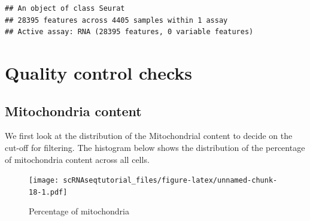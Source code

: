 \documentclass[
  openany]{book}
\newenvironment{Shaded}{\begin{snugshade}}{\end{snugshade}}
\newcommand{\AttributeTok}[1]{\textcolor[rgb]{0.77,0.63,0.00}{#1}}
\newcommand{\DecValTok}[1]{\textcolor[rgb]{0.00,0.00,0.81}{#1}}
\newcommand{\FloatTok}[1]{\textcolor[rgb]{0.00,0.00,0.81}{#1}}
\newcommand{\FunctionTok}[1]{\textcolor[rgb]{0.00,0.00,0.00}{#1}}
\newcommand{\NormalTok}[1]{#1}
\newcommand{\OtherTok}[1]{\textcolor[rgb]{0.56,0.35,0.01}{#1}}
\newcommand{\SpecialCharTok}[1]{\textcolor[rgb]{0.00,0.00,0.00}{#1}}
\newcommand{\StringTok}[1]{\textcolor[rgb]{0.31,0.60,0.02}{#1}}
\begin{document}
\begin{verbatim}
## An object of class Seurat 
## 28395 features across 4405 samples within 1 assay 
## Active assay: RNA (28395 features, 0 variable features)
\end{verbatim}

\hypertarget{quality-control-checks}{%
\section{Quality control checks}\label{quality-control-checks}}

\hypertarget{mitochondria-content}{%
\subsection{Mitochondria content}\label{mitochondria-content}}

We first look at the distribution of the Mitochondrial content to decide on the cut-off for filtering. The histogram below shows the distribution of the percentage of mitochondria content across all cells.

\begin{Shaded}
\end{Shaded}

\begin{figure}
\centering
\texttt{[image: scRNAseqtutorial\_files/figure-latex/unnamed-chunk-18-1.pdf]}
\caption{\label{fig:unnamed-chunk-18}Percentage of mitochondria}
\end{figure}
\end{document}
